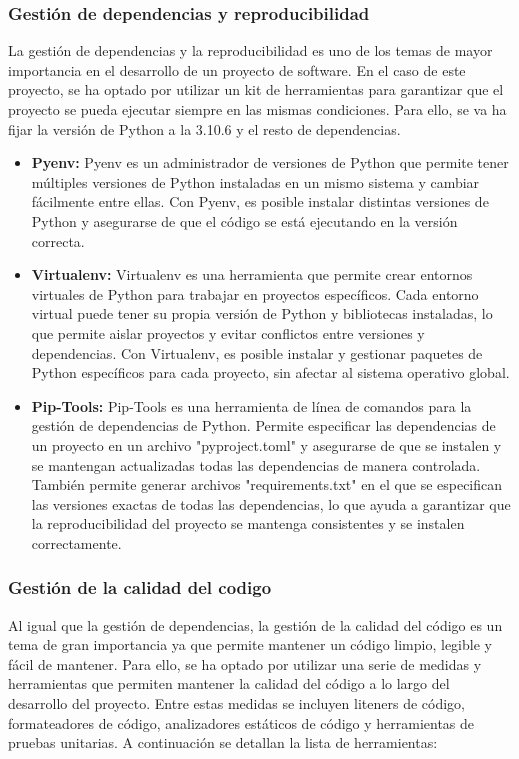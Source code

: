 \subsubsection{Gestión de dependencias y reproducibilidad}
La gestión de dependencias y la reproducibilidad es uno de los temas de mayor importancia en el 
desarrollo de un proyecto de software. En el caso de este proyecto, se ha optado por utilizar 
un kit de herramientas para garantizar que el proyecto se pueda ejecutar siempre en las mismas 
condiciones. Para ello, se va ha fijar la versión de Python a la 3.10.6 y el resto de dependencias. 

\begin{itemize}
    \item \textbf{Pyenv: } Pyenv es un administrador 
    de versiones de Python que permite tener múltiples versiones de Python instaladas en un mismo sistema 
    y cambiar fácilmente entre ellas. Con Pyenv, es posible instalar distintas versiones de 
    Python y asegurarse de que el código se está ejecutando en la versión correcta. 
    
    \item \textbf{Virtualenv: } Virtualenv es una herramienta que permite crear entornos virtuales de Python para trabajar 
    en proyectos específicos. Cada entorno virtual puede tener su propia versión de Python y bibliotecas instaladas, 
    lo que permite aislar proyectos y evitar conflictos entre versiones y dependencias. Con Virtualenv, 
    es posible instalar y gestionar paquetes de Python específicos para cada proyecto, sin afectar 
    al sistema operativo global.

    \item \textbf{Pip-Tools: } Pip-Tools es una herramienta de línea de comandos para la gestión de 
    dependencias de Python. Permite especificar las dependencias de un proyecto en un archivo 
    "pyproject.toml" y asegurarse de que se instalen y se mantengan actualizadas todas las dependencias 
    de manera controlada. También permite generar archivos "requirements.txt" en el que se especifican las 
    versiones exactas de todas las dependencias, lo que ayuda a garantizar que la reproducibilidad del 
    proyecto se mantenga consistentes y se instalen correctamente.

\end{itemize}


\subsubsection{Gestión de la calidad del codigo}
Al igual que la gestión de dependencias, la gestión de la calidad del código es un tema de gran importancia
ya que permite mantener un código limpio, legible y fácil de mantener. Para ello, se ha optado por utilizar
una serie de medidas y herramientas que permiten mantener la calidad del código a lo largo del desarrollo del proyecto.
Entre estas medidas se incluyen liteners de código, formateadores de código, analizadores estáticos de código y
herramientas de pruebas unitarias. A continuación se detallan la lista de herramientas:

